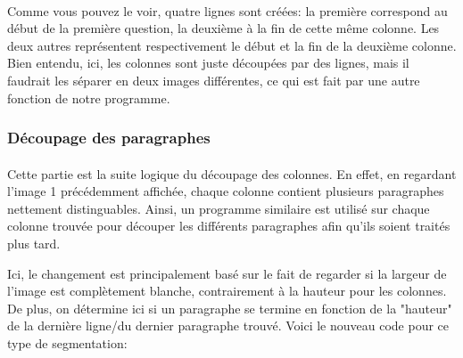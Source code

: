 \documentclass{article}
\begin{document}
	\paragraph{}
	Comme vous pouvez le voir, quatre lignes sont créées: la première correspond au début de la première question, la deuxième à la fin de cette même colonne. Les deux autres représentent respectivement le début et la fin de la deuxième colonne. Bien entendu, ici, les colonnes sont juste découpées par des lignes, mais il faudrait les séparer en deux images différentes, ce qui est fait par une autre fonction de notre programme.
	
	\subsubsection{Découpage des paragraphes}
	\paragraph{}
	Cette partie est la suite logique du découpage des colonnes. En effet, en regardant l'image 1 précédemment affichée, chaque colonne contient plusieurs paragraphes nettement distinguables. Ainsi, un programme similaire est utilisé sur chaque colonne trouvée pour découper les différents paragraphes afin qu'ils soient traités plus tard.
	\par
	Ici, le changement est principalement basé sur le fait de regarder si la largeur de l'image est complètement blanche, contrairement à la hauteur pour les colonnes. De plus, on détermine ici si un paragraphe se termine en fonction de la "hauteur" de la dernière ligne/du dernier paragraphe trouvé. Voici le nouveau code pour ce type de segmentation: \\
	
\end{document}
